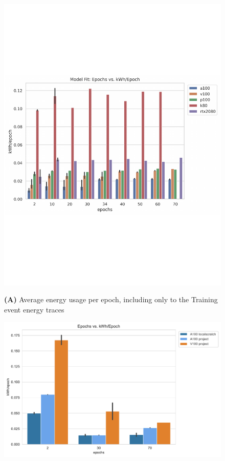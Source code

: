 \documentclass[utf8]{FrontiersinVancouver} %
\begin{document}
\begin{figure}[htb]

  \begin{center}

       \includegraphics[height=0.28\textheight]{images/energy_all_model_fit_kWh_per_epoch}

       {\bf (A)} Average energy usage per epoch, including only to the Training event energy traces

        \includegraphics[height=0.29\textheight]{images/total_kWh_per_epoch_new}


\end{center}
\end{figure}
\end{document}
